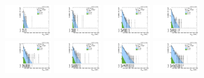 \begin{figure}[htbp]
  \includegraphics[width=0.18\textwidth]{fig/fitValidation/PostFit_SR_MVV_MJJ020to070__mu_HP_vbf_LDy_Run2.pdf}
  \includegraphics[width=0.18\textwidth]{fig/fitValidation/PostFit_SR_MVV_MJJ020to070__e_HP_vbf_LDy_Run2.pdf}
  \includegraphics[width=0.18\textwidth]{fig/fitValidation/PostFit_SR_MVV_MJJ020to070__mu_LP_vbf_LDy_Run2.pdf}
  \includegraphics[width=0.18\textwidth]{fig/fitValidation/PostFit_SR_MVV_MJJ020to070__e_LP_vbf_LDy_Run2.pdf}\\
  \includegraphics[width=0.18\textwidth]{fig/fitValidation/PostFit_SR_MVV_MJJ020to070__mu_HP_bb_HDy_Run2.pdf}
  \includegraphics[width=0.18\textwidth]{fig/fitValidation/PostFit_SR_MVV_MJJ020to070__e_HP_bb_HDy_Run2.pdf}
  \includegraphics[width=0.18\textwidth]{fig/fitValidation/PostFit_SR_MVV_MJJ020to070__mu_LP_bb_HDy_Run2.pdf}
  \includegraphics[width=0.18\textwidth]{fig/fitValidation/PostFit_SR_MVV_MJJ020to070__e_LP_bb_HDy_Run2.pdf}\\

\end{figure}
